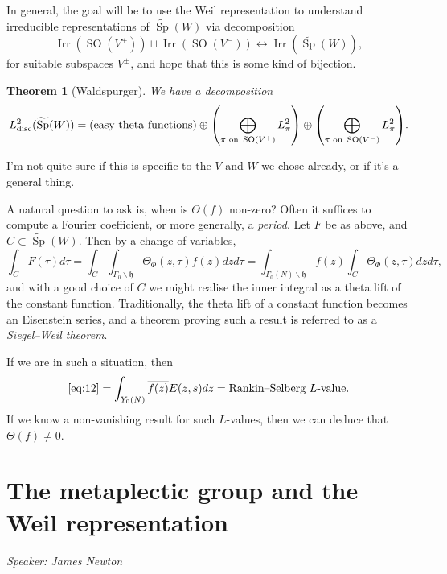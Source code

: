 \documentclass[11pt,a4paper,leqno]{article}
\let\mf\mathfrak
\newcommand{\1}{\mathbbm{1}}
\DeclareMathOperator{\disc}{disc}
\DeclareMathOperator{\Irr}{Irr}
\DeclareMathOperator{\Sp}{Sp}
\DeclareMathOperator{\SO}{SO}
\newcommand{\SpC}{\widetilde{\operatorname{\Sp}}}
\theoremstyle{plain}
\newtheorem{theorem}{Theorem}[section]
\theoremstyle{definition}
\theoremstyle{remark}
\numberwithin{equation}{section}
\begin{document}
In general, the goal will be to use the Weil representation to 
understand irreducible representations of $\SpC(W)$ via decomposition
\begin{equation}
  \label{eq:10}
\Irr(\SO(V^{+})) \sqcup \Irr(\SO(V^{-})) \leftrightarrow \Irr(\SpC(W)),
\end{equation}
for suitable subspaces $V^{\pm}$, and hope that this is some kind of
bijection.

\begin{theorem}[Waldspurger]
  We have a decomposition
  \begin{equation}
    \label{eq:11}
L^{2}_{\disc}(\SpC(W)) = \qty(\text{easy theta functions}) \oplus
\qty(\bigoplus_{\pi \text{ on } \SO(V^{+})} L^{2}_{\pi}) \oplus \qty(\bigoplus_{\pi \text{ on } \SO(V^{-})} L^{2}_{\pi}).
  \end{equation}
\end{theorem}
I'm not quite sure if this is specific to the $V$ and $W$ we chose
already, or if it's a general thing.

A natural question to ask is, when is $\Theta(f)$ non-zero? Often it
suffices to compute a Fourier coefficient, or more generally, a
\emph{period}. Let $F$ be as above, and $C \subset \SpC(W)$. Then by a
change of variables,
\begin{equation}
  \label{eq:12}
  \int_{C}F(\tau)d\tau = \int_{C}\int_{\Gamma_{0}\backslash \mf h} \Theta_{\Phi}(z,\tau)\overline{f(z)} dzd\tau =
  \int_{\Gamma_{0}(N)\backslash \mf h}\overline{f(z)} \int_{C}\Theta_{\Phi}(z,\tau)dzd\tau,
\end{equation}
and with a good choice of $C$ we might realise the inner integral as a
theta lift of the constant function. Traditionally, the theta lift of
a constant function becomes an Eisenstein series, and a theorem
proving such a result is referred to as a \emph{Siegel--Weil theorem}.

If we are in such a situation, then
\begin{equation}
  \label{eq:13}
\eqref{eq:12} = \int_{Y_{0}(N)} \overline{f(z)}E(z,s)dz =
\text{Rankin--Selberg $L$-value}.
\end{equation}
If we know a non-vanishing result for such $L$-values, then we can
deduce that $\Theta(f)\neq 0$.

\section{The metaplectic group and the Weil representation}
\label{sec:metaplectic-weil}
\emph{Speaker: James Newton}
\end{document}
